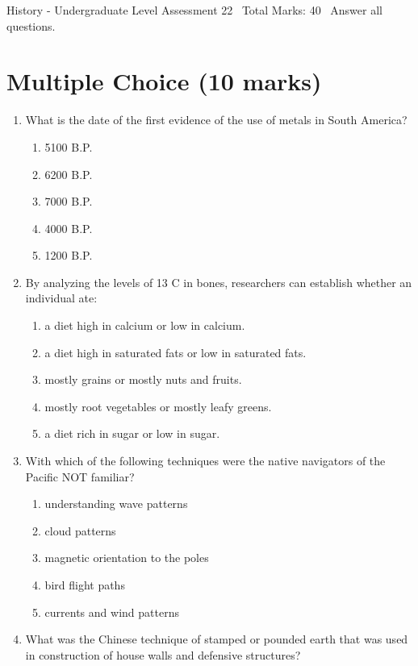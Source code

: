 \documentclass[12pt]{article}
\begin{document}
\begin{center}
History - Undergraduate Level Assessment 22 \
Total Marks: 40 \
Answer all questions.
\end{center}

\section*{Multiple Choice (10 marks)}
\begin{enumerate}[label=\arabic*.]
\item What is the date of the first evidence of the use of metals in South America?
\begin{enumerate}[label=(\alph*)]
    \item 5100 B.P.
    \item 6200 B.P.
    \item 7000 B.P.
    \item 4000 B.P.
    \item 1200 B.P.
\end{enumerate}
\item By analyzing the levels of 13 C in bones, researchers can establish whether an individual ate:
\begin{enumerate}[label=(\alph*)]
    \item a diet high in calcium or low in calcium.
    \item a diet high in saturated fats or low in saturated fats.
    \item mostly grains or mostly nuts and fruits.
    \item mostly root vegetables or mostly leafy greens.
    \item a diet rich in sugar or low in sugar.
\end{enumerate}
\item With which of the following techniques were the native navigators of the Pacific NOT familiar?
\begin{enumerate}[label=(\alph*)]
    \item understanding wave patterns
    \item cloud patterns
    \item magnetic orientation to the poles
    \item bird flight paths
    \item currents and wind patterns
\end{enumerate}
\item What was the Chinese technique of stamped or pounded earth that was used in construction of house walls and defensive structures?

\end{enumerate}
\end{document}
